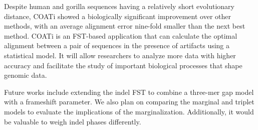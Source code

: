 Despite human and gorilla sequences having a relatively short evolutionary distance, COATi showed a biologically significant improvement over other methods, with an average alignment error nine-fold smaller than the next best method.
COATi is an FST-based application that can calculate the optimal alignment
between a pair of sequences in the presence of artifacts using a statistical
model.
It will allow researchers to analyze more data with higher accuracy and
facilitate the study of important biological processes that shape genomic data.

Future works include extending the indel FST to combine a three-mer gap model with a frameshift parameter.
We also plan on comparing the marginal and triplet models to evaluate the implications of the marginalization.
Additionally, it would be valuable to weigh indel phases differently.

